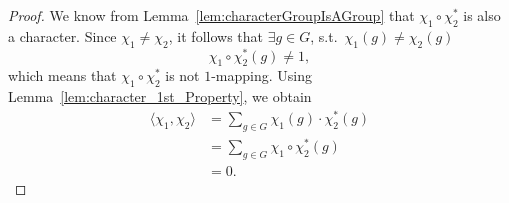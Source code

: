 \documentclass{article}
\theoremstyle{definition}
\numberwithin{equation}{theorem}
\numberwithin{figure}{theorem}
\newcommand{\bilinearForm}[2]{\ensuremath{\langle#1,#2\rangle}}
\newcommand{\composition}[2]{\ensuremath{#1\circ#2}}
\newcommand{\sothat}{s.t.\ }
\begin{document}
    \begin{proof}
        We know from Lemma~\ref{lem:characterGroupIsAGroup} that $\composition{\chi_1}{\chi_2^{*}}$ is also a character.
        Since $\chi_1 \neq \chi_2$, it follows that $\exists g \in G$, \sothat $\chi_1(g) \neq \chi_2(g)$
        \[\composition{\chi_1}{\chi_2^{*}}(g) \neq 1,\]
        which means that $\composition{\chi_1}{\chi_2^{*}} $ is not $1$-mapping.
        Using Lemma~\ref{lem:character_1st_Property}, we obtain
        \begin{align*}
            \bilinearForm{\chi_1}{\chi_2} &= \sum_{g \in G} \chi_1(g) \cdot \chi_2^{*}(g)\\
            &= \sum_{g \in G} \composition{\chi_1}{\chi_2^{*}(g)} \\
            &= 0.
        \end{align*}
    \end{proof}
\end{document}
